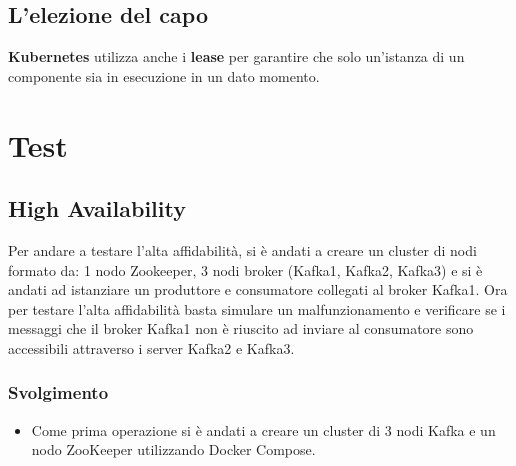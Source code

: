 \documentclass{article}
\begin{document}
\subsection{L'elezione del capo}
\textbf{Kubernetes} utilizza anche i \textbf{lease} per garantire che solo un'istanza di un componente sia in esecuzione in un dato momento. 

\section{Test}
\subsection{High Availability}
Per andare a testare l'alta affidabilità, si è andati a creare un cluster di nodi formato da: 1 nodo Zookeeper, 3 nodi broker (Kafka1, Kafka2, Kafka3) e si è andati ad istanziare un produttore e consumatore collegati al broker Kafka1. Ora per testare l'alta affidabilità basta simulare un malfunzionamento e verificare se i messaggi che il broker Kafka1 non è riuscito ad inviare al consumatore sono accessibili attraverso i server Kafka2 e Kafka3. 

\subsubsection{Svolgimento}
\begin{itemize}
    \item Come prima operazione si è andati a creare un cluster di 3 nodi Kafka e un nodo ZooKeeper utilizzando Docker Compose.
\end{itemize}
\end{document}
